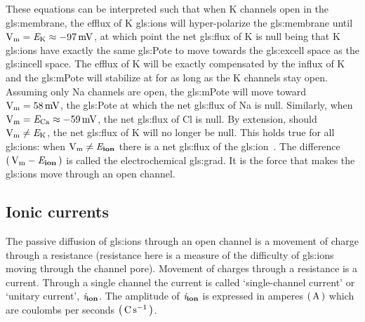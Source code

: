 \documentclass[class={myRUCProject}, crop=false]{standalone}
\begin{document}
These equations can be interpreted such that when
\gls{K} channels open in the \gls{gls:membrane}, the efflux of \gls{K} \glspl{gls:ion} will hyper-polarize the \gls{gls:membrane} until \(\unit{\V\membrane} = \equilibria\potassium \approx \qty{-97}{\mV}\), at which point the net \gls{gls:flux} of \gls{K} is null being that \gls{K} \glspl{gls:ion} have exactly the same \gls{gls:Pote} to move towards the \gls{gls:excell} space as the \gls{gls:incell} space. 
The efflux of \gls{K} will be exactly compensated by the influx of \gls{K} and the \gls{gls:mPote} will stabilize at \equilibria\potassium for as long as the \gls{K} channels stay open. 
Assuming only \gls{Na} channels are open, the \gls{gls:mPote} will move toward \(\unit{\V\membrane} = \qty{58}{\mV}\), the \gls{gls:Pote} at which the net \gls{gls:flux} of \gls{Na} is null. 
Similarly, when \(\unit{\V\membrane} = \equilibria\chlorine \approx \qty{-59}{\mV}\), 
the net \gls{gls:flux} of \gls{Cl} is null. 
By extension, should \(\unit{\V\membrane} \neq \equilibria\potassium\), the net \gls{gls:flux} of \gls{K} will no longer be null. 
This holds true for all \glspl{gls:ion}: when \(\unit{\V\membrane} \neq \equilibria\ion\) there is a net \gls{gls:flux} of the \gls{gls:ion}~\cite{}. The difference \(\br{\unit{\V\membrane} - \equilibria\ion}\) is called the electrochemical \gls{gls:grad}. It is the force that makes the \glspl{gls:ion} move through an open channel.

\endgroup

\subsection{Ionic currents}
The passive diffusion of \glspl{gls:ion} through an open channel is a movement of charge through a resistance (resistance here is a measure of the difficulty of \glspl{gls:ion} moving through the channel pore). Movement of charges through a resistance is a current. Through a single channel the current is called `single-channel current' or `unitary current', \(\mathit{i}_\mathbf{ion}\). The amplitude of \(\mathit{i}_\mathbf{ion}\) is expressed in amperes \(\br{\unit{\ampere}}\) which are coulombs per seconds \(\br{\unit{\coulomb\per\second}}\). 
\end{document}
